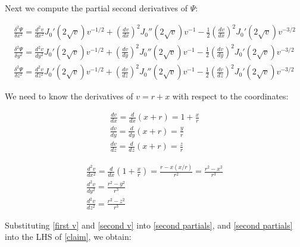 \documentclass{article}
\begin{document}
Next we compute the partial second derivatives of $\Psi$:

\begin{equation}
\label{second partials}
\begin{gathered}
\frac{\delta^2 \Psi}{\delta x^2} = \frac{d^2 v}{d x^2} J_0'(2\sqrt{v}) v^{-1/2} + \left(\frac{d v}{d x}\right)^2 J_0''(2\sqrt{v}) v^{-1} - \frac{1}{2} \left(\frac{d v}{d x}\right)^2 J_0'(2\sqrt{v}) v^{-3/2} \\
\frac{\delta^2 \Psi}{\delta y^2} = \frac{d^2 v}{d y^2} J_0'(2\sqrt{v}) v^{-1/2} + \left(\frac{d v}{d y}\right)^2 J_0''(2\sqrt{v}) v^{-1} - \frac{1}{2} \left(\frac{d v}{d y}\right)^2 J_0'(2\sqrt{v}) v^{-3/2} \\
\frac{\delta^2 \Psi}{\delta z^2} = \frac{d^2 v}{d z^2} J_0'(2\sqrt{v}) v^{-1/2} + \left(\frac{d v}{d z}\right)^2 J_0''(2\sqrt{v}) v^{-1} - \frac{1}{2} \left(\frac{d v}{d z}\right)^2 J_0'(2\sqrt{v}) v^{-3/2}
\end{gathered}
\end{equation}

\vskip 12pt

We need to know the derivatives of $v=r+x$ with respect to the coordinates:

\vskip 12pt

\begin{equation}
\label{first v}
\begin{gathered}
\frac{d v}{d x} = \frac{d}{d x} (x+r) = 1 + \frac{x}{r} \\
\frac{d v}{d y} = \frac{d}{d y} (x+r) = \frac{y}{r} \\
\frac{d v}{d z} = \frac{d}{d z} (x+r) = \frac{z}{r}
\end{gathered}
\end{equation}

\vskip 12pt

\begin{equation}
\label{second v}
\begin{gathered}
\frac{d^2 v}{d x^2} = \frac{d}{d x} \left(1 + \frac{x}{r}\right) = \frac{r - x(x/r)}{r^2} = \frac{r^2 - x^2}{r^3} \\
\frac{d^2 v}{d y^2} = \frac{r^2 - y^2}{r^3} \\
\frac{d^2 v}{d z^2} = \frac{r^2 - z^2}{r^3}
\end{gathered}
\end{equation}

\vskip 20pt

Substituting \eqref{first v} and \eqref{second v} into \eqref{second partials}, and \eqref{second partials}
into the LHS of \eqref{claim}, we obtain:
\end{document}
